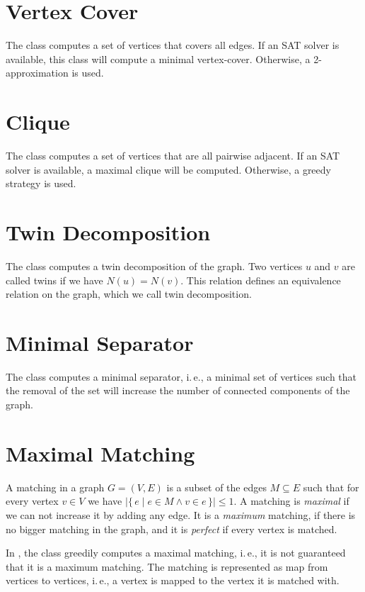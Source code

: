 \documentclass[a4paper, ukenglish, twoside, openright]{jdrasilmanual}
\begin{document}
\section{Vertex Cover}
The class  computes a set of vertices that covers all edges. If an SAT solver is
available, this class will compute a minimal vertex-cover. Otherwise,
a 2-approximation is used.

\section{Clique}
The class  computes a set of vertices that are all pairwise adjacent. If an SAT
solver is available, a maximal clique will be computed. Otherwise, a
greedy strategy is used.

\section{Twin Decomposition}
The class  computes a twin decomposition of
the graph. Two vertices $u$ and $v$ are
called twins if we have $N(u)=N(v)$. This relation defines an
equivalence relation on the graph, which we call twin decomposition.

\section{Minimal Separator}
The class  computes a minimal separator, i.\,e., a minimal set of vertices such
that the removal of the set will increase the number of connected
components of the graph.

\section{Maximal Matching}
A matching in a graph \(G=(V,E)\) is a subset of the edges
\(M\subseteq E\) such that for every vertex \(v\in V\) we have
\(|\{\,e\mid e\in M\wedge v\in e\,\}|\leq 1\). A matching is \emph{maximal} if
we can not increase it by adding any edge. It is a \emph{maximum} matching,
if there is no bigger matching in the graph, and it is \emph{perfect} if
every vertex is matched.
  
In \Jdrasil, the class  greedily computes a maximal matching, i.\,e., it is not
guaranteed that it is a maximum matching. The matching is represented
as map from vertices to vertices, i.\,e., a vertex is mapped to the
vertex it is matched with.
\end{document}
